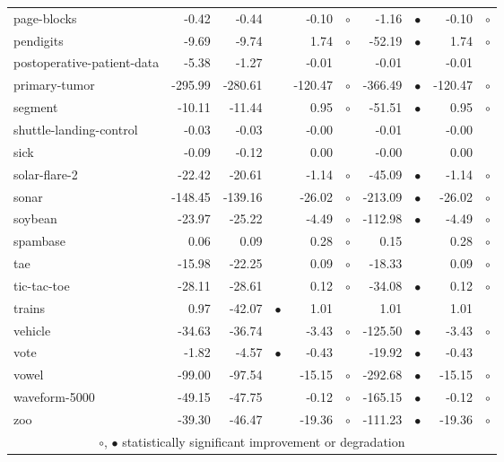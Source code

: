 {\begin{longtable}{lrr@{\hspace{0.1cm}}cr@{\hspace{0.1cm}}cr@{\hspace{0.1cm}}cr@{\hspace{0.1cm}}c}
page-blocks &   -0.42 &   -0.44 &           &   -0.10 &  $\circ$ &   -1.16 & $\bullet$ &   -0.10 &  $\circ$\\
pendigits &   -9.69 &   -9.74 &           &    1.74 &  $\circ$ &  -52.19 & $\bullet$ &    1.74 &  $\circ$\\
postoperative-patient-data &   -5.38 &   -1.27 &           &   -0.01 &          &   -0.01 &           &   -0.01 &         \\
primary-tumor & -295.99 & -280.61 &           & -120.47 &  $\circ$ & -366.49 & $\bullet$ & -120.47 &  $\circ$\\
segment &  -10.11 &  -11.44 &           &    0.95 &  $\circ$ &  -51.51 & $\bullet$ &    0.95 &  $\circ$\\
shuttle-landing-control &   -0.03 &   -0.03 &           &   -0.00 &          &   -0.01 &           &   -0.00 &         \\
sick &   -0.09 &   -0.12 &           &    0.00 &          &   -0.00 &           &    0.00 &         \\
solar-flare-2 &  -22.42 &  -20.61 &           &   -1.14 &  $\circ$ &  -45.09 & $\bullet$ &   -1.14 &  $\circ$\\
sonar & -148.45 & -139.16 &           &  -26.02 &  $\circ$ & -213.09 & $\bullet$ &  -26.02 &  $\circ$\\
soybean &  -23.97 &  -25.22 &           &   -4.49 &  $\circ$ & -112.98 & $\bullet$ &   -4.49 &  $\circ$\\
spambase &    0.06 &    0.09 &           &    0.28 &  $\circ$ &    0.15 &           &    0.28 &  $\circ$\\
tae &  -15.98 &  -22.25 &           &    0.09 &  $\circ$ &  -18.33 &           &    0.09 &  $\circ$\\
tic-tac-toe &  -28.11 &  -28.61 &           &    0.12 &  $\circ$ &  -34.08 & $\bullet$ &    0.12 &  $\circ$\\
trains &    0.97 &  -42.07 & $\bullet$ &    1.01 &          &    1.01 &           &    1.01 &         \\
vehicle &  -34.63 &  -36.74 &           &   -3.43 &  $\circ$ & -125.50 & $\bullet$ &   -3.43 &  $\circ$\\
vote &   -1.82 &   -4.57 & $\bullet$ &   -0.43 &          &  -19.92 & $\bullet$ &   -0.43 &         \\
vowel &  -99.00 &  -97.54 &           &  -15.15 &  $\circ$ & -292.68 & $\bullet$ &  -15.15 &  $\circ$\\
waveform-5000 &  -49.15 &  -47.75 &           &   -0.12 &  $\circ$ & -165.15 & $\bullet$ &   -0.12 &  $\circ$\\
zoo &  -39.30 &  -46.47 &           &  -19.36 &  $\circ$ & -111.23 & $\bullet$ &  -19.36 &  $\circ$\\
\hline
\multicolumn{10}{c}{$\circ$, $\bullet$ statistically significant improvement or degradation}\\
\end{longtable} \footnotesize \par}